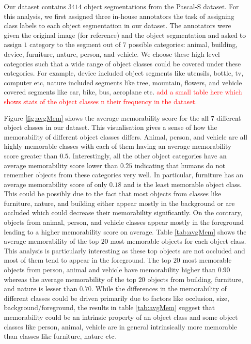 Our dataset contains $3414$ object segmentations from the Pascal-S dataset. For this analysis, we first assigned three in-house annotators the task of assigning class labels to each object segmentation in our dataset. The annotators were given the original image (for reference) and the object segmentation and asked to assign $1$ category to the segment out of $7$ possible categories: animal, building, device, furniture, nature, person, and vehicle. We choose these high-level categories such that a wide range of object classes could be covered under these categories. For example, device included object segments like utensils, bottle, tv, computer etc, nature included segments like tree, mountain, flowers, and vehicle covered segments like car, bike, bus, aeroplane etc. \textcolor{red}{add a small table here which shows stats of the object classes n their frequency in the dataset.}

Figure \ref{fig:avgMem} shows the average memorability score for the all $7$ different object classes in our dataset. This visualisation gives a sense of how the memorability of different object classes differs. Animal, person, and vehicle are all highly memorable classes with each of them having an average memorability score greater than $0.5$. Interestingly, all the other object categories have an average memorability score lower than $0.25$ indicating that humans do not remember objects from these categories very well. In particular, furniture has an average memorability score of only $0.18$ and is the least memorable object class. This could be possibly due to the fact that most objects from classes like furniture, nature, and building either appear mostly in the background or are occluded which could decrease their memorability significantly. On the contrary, objects from animal, person, and vehicle classes appear mostly in the foreground leading to a higher memorability score on average. Table \ref{tab:avgMem} shows the average memorability of the top $20$ most memorable objects for each object class. This analysis is particularly interesting as these top objects are not occluded and most of them tend to appear in the foreground. The top $20$ most memorable objects from person, animal and vehicle have memorability higher than $0.90$ whereas the average memorability of the top $20$ objects from building, furniture, and nature is lesser than $0.70$. While the differences in the memorability of different classes could be driven primarily due to factors like occlusion, size, background/foreground, the results in table \ref{tab:avgMem} suggest that memorability could be an intrinsic property of an object class and some object classes like person, animal, vehicle are in general intrinsically more memorable than classes like furniture, nature etc.

